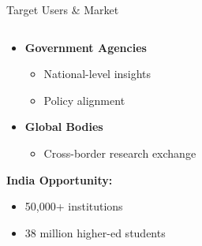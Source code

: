 \documentclass[aspectratio=169]{beamer}
\begin{document}
\begin{frame}{Target Users \& Market}
\begin{columns}[t]
\begin{column}{0.5\textwidth}
\begin{itemize}
\item \textbf{Government Agencies}
    \begin{itemize}
    \item National-level insights
    \item Policy alignment
    \end{itemize}

\vspace{0.2cm}

\item \textbf{Global Bodies}
    \begin{itemize}
    \item Cross-border research exchange
    \end{itemize}
\end{itemize}

\vspace{0.5cm}

\textbf{India Opportunity:}
\begin{itemize}
\item 50,000+ institutions
\item 38 million higher-ed students
\end{itemize}
\end{column}
\end{columns}

\end{frame}
\end{document}
